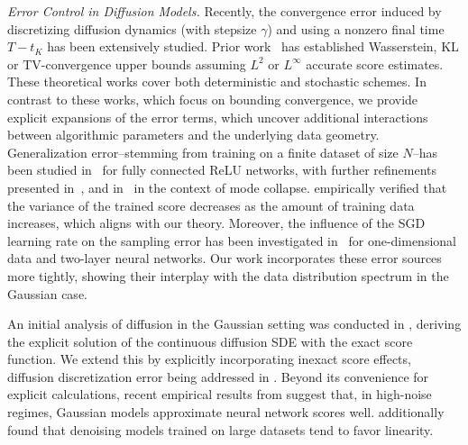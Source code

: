 \documentclass[11pt]{article}
\newcommand{\sh}[1]{{\color{red}{#1}}}
\begin{document}
\noindent\textit{Error Control in Diffusion Models.}
%
Recently, the convergence error induced by discretizing diffusion dynamics (with stepsize $\gamma$) and using a nonzero final time $T-t_K$ has been extensively studied. Prior work~\cite{benton2023nearly, chen2023improved, chen2022sampling, li2023towards} has established Wasserstein, KL or TV-convergence upper bounds assuming $L^2$ or $L^\infty$ accurate score estimates. These theoretical works cover both deterministic and stochastic schemes. %
%
In contrast to these works, which focus on bounding convergence, we provide explicit expansions of the error terms, which uncover additional interactions between algorithmic parameters and the underlying data geometry. 
%
Generalization error--stemming from training on a finite dataset of size $N$--has been studied in~\cite{zhu2023sample} for fully connected ReLU networks, with further refinements presented in~\cite{gupta2024improved}, and in~\cite{Biroli2024} in the context of mode collapse. \cite{kadkhodaie2023generalization} empirically verified that the variance of the trained score decreases as the amount of training data increases, which aligns with our theory. Moreover, the influence of the SGD learning rate on the sampling error has been investigated in~\cite{wu2025taking} for one-dimensional data and two-layer neural networks. 
%
Our work incorporates these error sources more tightly, showing their interplay with the data distribution spectrum in the Gaussian case.

An initial analysis of diffusion in the Gaussian setting was conducted in \cite{pierret2024diffusion}, deriving the explicit solution of the continuous diffusion SDE with the exact score function. We extend this by explicitly incorporating inexact score effects, diffusion discretization error being addressed in \cite{hurault2026geometry}.  Beyond its convenience for explicit calculations, recent empirical results from \cite{wang2024unreasonable, wang2023hidden} suggest that, in high-noise regimes, Gaussian models approximate neural network scores well. \cite{li2024understanding} additionally found that denoising models trained on large datasets tend to favor linearity.
\end{document}
